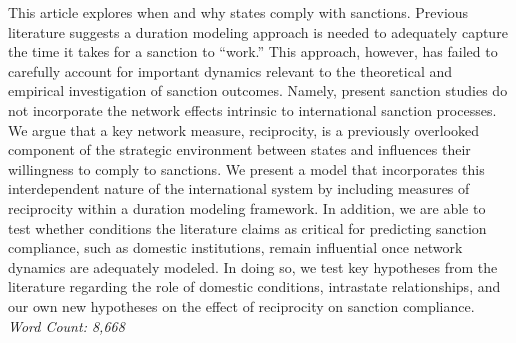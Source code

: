 This article explores when and why states comply with sanctions. Previous literature suggests a duration modeling approach is needed to adequately capture the time it takes for a sanction to ``work.'' This approach, however, has failed to carefully account for important dynamics relevant to the theoretical and empirical investigation of sanction outcomes. Namely, present sanction studies do not incorporate the network effects intrinsic to international sanction processes. We argue that a key network measure, reciprocity, is a previously overlooked component of the strategic environment between states and influences their willingness to comply to sanctions. We present a model that incorporates this interdependent nature of the international system by including measures of reciprocity within a duration modeling framework. In addition, we are able to test whether conditions the literature claims as critical for predicting sanction compliance, such as domestic institutions, remain influential once network dynamics are adequately modeled. In doing so, we test key hypotheses from the literature regarding the role of domestic conditions, intrastate relationships, and our own new hypotheses on the effect of reciprocity on sanction compliance. \\

\noindent \textit{Word Count: 8,668}